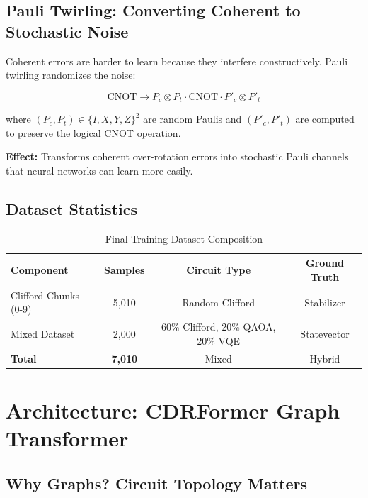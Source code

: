 \documentclass[11pt, a4paper]{article}
\begin{document}
\subsection{Pauli Twirling: Converting Coherent to Stochastic Noise}

Coherent errors are harder to learn because they interfere constructively. Pauli twirling randomizes the noise:

\begin{equation}
\text{CNOT} \rightarrow P_c \otimes P_t \cdot \text{CNOT} \cdot P'_c \otimes P'_t
\end{equation}

where $(P_c, P_t) \in \{I, X, Y, Z\}^2$ are random Paulis and $(P'_c, P'_t)$ are computed to preserve the logical CNOT operation.

\textbf{Effect:} Transforms coherent over-rotation errors into stochastic Pauli channels that neural networks can learn more easily.

\subsection{Dataset Statistics}

\begin{table}[H]
\centering
\caption{Final Training Dataset Composition}
\begin{tabular}{@{}lccc@{}}
\toprule
\textbf{Component} & \textbf{Samples} & \textbf{Circuit Type} & \textbf{Ground Truth} \\ \midrule
Clifford Chunks (0-9) & 5,010 & Random Clifford & Stabilizer \\
Mixed Dataset & 2,000 & 60\% Clifford, 20\% QAOA, 20\% VQE & Statevector \\
\midrule
\textbf{Total} & \textbf{7,010} & Mixed & Hybrid \\
\bottomrule
\end{tabular}
\end{table}

\section{Architecture: CDRFormer Graph Transformer}

\subsection{Why Graphs? Circuit Topology Matters}
\end{document}
